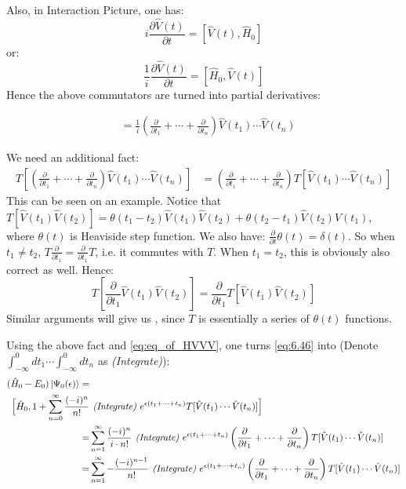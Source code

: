 \documentclass{article}
\numberwithin{equation}{subsection} %
\begin{document}
Also, in Interaction Picture, one has:
$$ i\frac{\partial \hat{V}(t)}{\partial t} = [\hat{V}(t),\hat{H}_0]$$
or:
$$ \frac{1}{i} \frac{\partial \hat{V}(t)}{\partial t} = [\hat{H}_0,\hat{V}(t)]$$
Hence the above commutators are turned into partial derivatives:

\begin{align}
[\hat{H}_0,\hat{V}(t_1)\dotsb\hat{V}(t_n)] &= \frac{1}{i} \left( \frac{\partial}{\partial t_1} + \dotsb + \frac{\partial}{\partial t_n}  \right)  \hat{V}(t_1)\dotsb\hat{V}(t_{n})
\label{eq:eq_of_HVVV}
\end{align}

We need an additional fact:
\begin{align}
T[\left( \frac{\partial}{\partial t_1} + \dotsb + \frac{\partial}{\partial t_n}  \right)  \hat{V}(t_1)\dotsb\hat{V}(t_{n})] &= \left( \frac{\partial}{\partial t_1} + \dotsb + \frac{\partial}{\partial t_n}  \right)  T [\hat{V}(t_1)\dotsb\hat{V}(t_{n})]
\label{eq:partial_T}
\end{align}
This can be seen on an example. Notice that 
$T[\hat{V}(t_1)\hat{V}(t_2)] = \theta(t_1-t_2)\hat{V}(t_1)\hat{V}(t_2) + \theta(t_2-t_1)\hat{V}(t_2)\hat{V}(t_1)$, where $\theta(t)$ is Heaviside step function. We also have: $\frac{\partial}{\partial t}\theta(t) = \delta(t) $. So when $t_1\neq t_2$, $T\frac{\partial}{\partial t_1} = \frac{\partial}{\partial t_1} T$, i.e. it commutes with $T$. When $t_1 = t_2$, this is obviously also correct as well. Hence:
$$
T[ \frac{\partial}{\partial t_1} \hat{V}(t_1) \hat{V}(t_{2})] = 
\frac{\partial}{\partial t_1} T[  \hat{V}(t_1) \hat{V}(t_{2})]
$$
Similar arguments will give us , since $T$ is essentially a series of $\theta(t)$ functions.

Using the above fact and \ref*{eq:eq_of_HVVV}, one turns \ref*{eq:6.46} into (Denote $\int_{-\infty}^{0} dt_1\dotsb \int_{-\infty}^{0} dt_n$ as \textit{(Integrate)}):
\begin{align}
(\hat{H}_0-E_0)\ket{\Psi_0(\epsilon)} =& \nonumber\\
\Bigl[ 
\hat{H}_0, 1+\sum_{n=0}^{\infty} \frac{(-i)^n}{n!} 
&\text{\textit{ (Integrate) }}
e^{\epsilon(t_1+\dotsb+t_n)} T[\hat{V}(t_1)\dotsb \hat{V}(t_n)]
\Bigr] \nonumber\\
=& \sum_{n=1}^{\infty} \frac{(-i)^n}{i\cdot n!} 
\text{\textit{ (Integrate) }}
e^{\epsilon(t_1+\dotsb+t_n)} 
\left( \frac{\partial}{\partial t_1} + \dotsb + \frac{\partial}{\partial t_n}  \right) 
T[\hat{V}(t_1)\dotsb \hat{V}(t_n)] \nonumber\\
=& \sum_{n=1}^{\infty} - \frac{(-i)^{n-1}}{n!} 
\text{\textit{ (Integrate) }}
e^{\epsilon(t_1+\dotsb+t_n)}
\left( \frac{\partial}{\partial t_1} + \dotsb + \frac{\partial}{\partial t_n}  \right)
T[\hat{V}(t_1)\dotsb \hat{V}(t_n)]
\label{eq:6.46_2}
\end{align}
\end{document}
